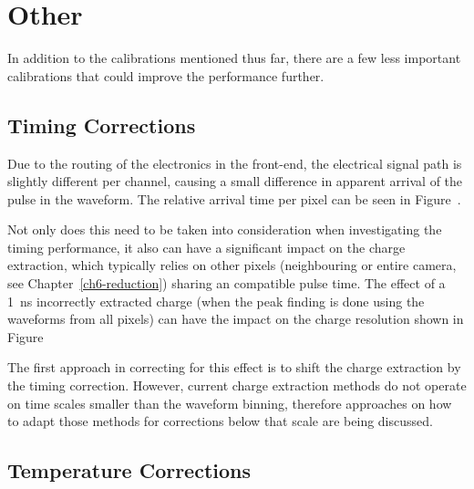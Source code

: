 
\section{Other}

In addition to the calibrations mentioned thus far, there are a few less important calibrations that could improve the performance further. 

\subsection{Timing Corrections}

Due to the routing of the electronics in the front-end, the electrical signal path is slightly different per channel, causing a small difference in apparent arrival of the pulse in the waveform. The relative arrival time per pixel can be seen in Figure~. 

Not only does this need to be taken into consideration when investigating the timing performance, it also can have a significant impact on the charge extraction, which typically relies on other pixels (neighbouring or entire camera, see Chapter~\ref{ch6-reduction}) sharing an compatible pulse time. The effect of a 1~ns incorrectly extracted charge (when the peak finding is done using the waveforms from all pixels) can have the impact on the charge resolution shown in Figure~

The first approach in correcting for this effect is to shift the charge extraction by the timing correction. However, current charge extraction methods do not operate on time scales smaller than the waveform binning, therefore approaches on how to adapt those methods for corrections below that scale are being discussed.

\subsection{\label{temperature_corrections}Temperature Corrections}

